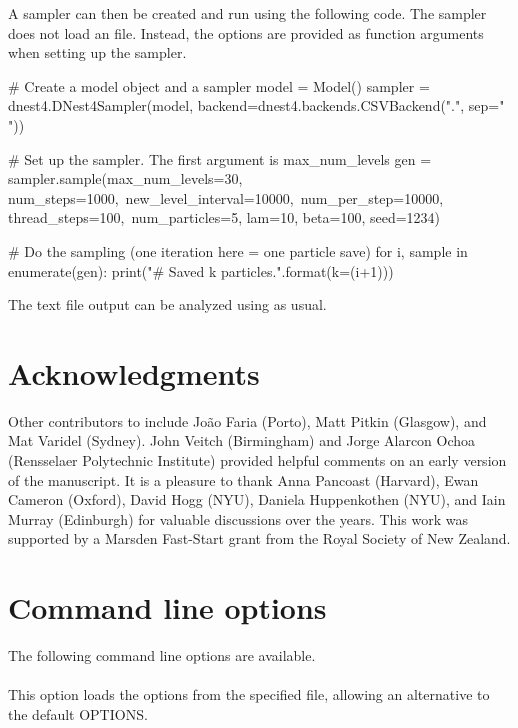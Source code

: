 \documentclass[article]{jss}
\begin{document}
%
A sampler can then be created and run using the following code.
The  sampler does not load an  file.
Instead, the options are provided as function arguments
when setting up the sampler.
%
\begin{CodeChunk}
\begin{CodeInput}
# Create a model object and a sampler
model = Model()
sampler = dnest4.DNest4Sampler(model,
                               backend=dnest4.backends.CSVBackend(".",
                                                                  sep=" "))

# Set up the sampler. The first argument is max_num_levels
gen = sampler.sample(max_num_levels=30, num_steps=1000,\
                      new_level_interval=10000,\
                      num_per_step=10000, thread_steps=100,\
                      num_particles=5, lam=10, beta=100, seed=1234)

# Do the sampling (one iteration here = one particle save)
for i, sample in enumerate(gen):
    print("# Saved {k} particles.".format(k=(i+1)))
\end{CodeInput}
\end{CodeChunk}
%
The text file output can be analyzed using 
as usual.

\section*{Acknowledgments}
Other contributors to  include
João Faria (Porto), Matt Pitkin (Glasgow), and Mat Varidel (Sydney).
John Veitch (Birmingham)
and Jorge Alarcon Ochoa (Rensselaer Polytechnic Institute)
provided helpful comments on an early
version of the manuscript.
It is a pleasure to thank Anna Pancoast (Harvard),
Ewan Cameron (Oxford), David Hogg (NYU), Daniela Huppenkothen (NYU),
and Iain Murray (Edinburgh)
for valuable discussions over the years.
This work was supported by a Marsden Fast-Start grant
from the Royal Society of New Zealand.



\newpage
\appendix
\section{Command line options}\label{sec:command_line_options}
The following command line options are available.\\

\code{-o <filename>}\\
This option loads the \pkg{DNest4} options from the specified file, allowing
an alternative to the default OPTIONS.\\
\end{document}
